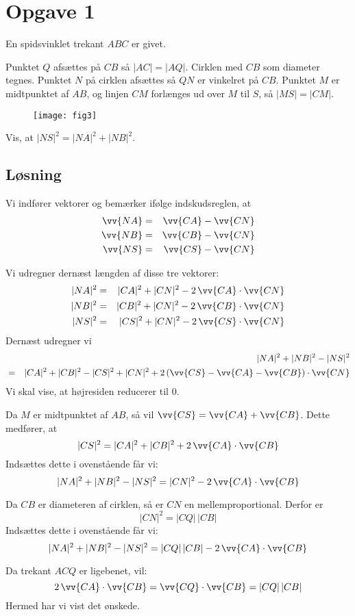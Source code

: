\documentclass[12pt,oneside,a4paper]{article}
\newcommand{\bas}{\begin{eqnarray*}}
\newcommand{\eas}{\end{eqnarray*}}
\begin{document}
\section{Opgave 1}
En spidsvinklet trekant $ABC$ er givet.

Punktet $Q$ afsættes på $CB$ så $|AC| = |AQ|$. Cirklen med $CB$ som diameter tegnes. 
Punktet $N$ på cirklen afsættes så $QN$ er vinkelret på $CB$.
Punktet $M$ er midtpunktet af $AB$, og linjen $CM$ forlænges ud over $M$ til $S$,
så $|MS|=|CM|$.

\begin{figure}[ht]
    \centering
    \texttt{[image: fig3]}
    \label{fig3}
\end{figure}

Vis, at $|NS|^2 = |NA|^2 + |NB|^2$.

\subsection{Løsning}
Vi indfører vektorer og bemærker ifølge indskudsreglen, at
\bas
\vv{NA} &=& \vv{CA} - \vv{CN} \\
\vv{NB} &=& \vv{CB} - \vv{CN} \\
\vv{NS} &=& \vv{CS} - \vv{CN}
\eas

Vi udregner dernæst længden af disse tre vektorer:
\bas
|NA|^2 &=& |CA|^2 + |CN|^2 - 2\, \vv{CA}\cdot\vv{CN} \\
|NB|^2 &=& |CB|^2 + |CN|^2 - 2\, \vv{CB}\cdot\vv{CN} \\
|NS|^2 &=& |CS|^2 + |CN|^2 - 2\, \vv{CS}\cdot\vv{CN} 
\eas
Dernæst udregner vi
\bas
&& |NA|^2 + |NB|^2 - |NS|^2 \\
&=& |CA|^2 + |CB|^2 - |CS|^2 + |CN|^2 + 2\, (\vv{CS}-\vv{CA}-\vv{CB})\cdot\vv{CN}
\eas
Vi skal vise, at højresiden reducerer til 0.

Da $M$ er midtpunktet af $AB$, så vil $\vv{CS} = \vv{CA} + \vv{CB}$.
Dette medfører, at 
$$
|CS|^2 = |CA|^2 + |CB|^2 + 2 \, \vv{CA}\cdot\vv{CB}
$$
Indsættes dette i ovenstående får vi:
$$
|NA|^2 + |NB|^2 - |NS|^2 = |CN|^2 - 2\,  \vv{CA}\cdot\vv{CB}
$$

Da $CB$ er diameteren af cirklen, så er $CN$ en mellemproportional. Derfor er
$$
|CN|^2 = |CQ| \, |CB|
$$
Indsættes dette i ovenstående får vi:
$$
|NA|^2 + |NB|^2 - |NS|^2 = |CQ|\,|CB| - 2\,  \vv{CA}\cdot\vv{CB}
$$

Da trekant $ACQ$ er ligebenet, vil:
$$
2\,\vv{CA}\cdot\vv{CB} = \vv{CQ}\cdot\vv{CB} = |CQ|\,|CB|
$$
Hermed har vi vist det ønskede.
\end{document}
